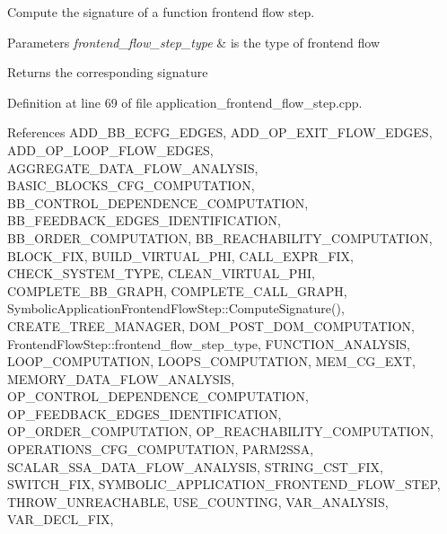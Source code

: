 Compute the signature of a function frontend flow step. 


\begin{DoxyParams}{Parameters}
{\em frontend\+\_\+flow\+\_\+step\+\_\+type} & is the type of frontend flow \\
\hline
\end{DoxyParams}
\begin{DoxyReturn}{Returns}
the corresponding signature 
\end{DoxyReturn}


Definition at line 69 of file application\+\_\+frontend\+\_\+flow\+\_\+step.\+cpp.



References A\+D\+D\+\_\+\+B\+B\+\_\+\+E\+C\+F\+G\+\_\+\+E\+D\+G\+ES, A\+D\+D\+\_\+\+O\+P\+\_\+\+E\+X\+I\+T\+\_\+\+F\+L\+O\+W\+\_\+\+E\+D\+G\+ES, A\+D\+D\+\_\+\+O\+P\+\_\+\+L\+O\+O\+P\+\_\+\+F\+L\+O\+W\+\_\+\+E\+D\+G\+ES, A\+G\+G\+R\+E\+G\+A\+T\+E\+\_\+\+D\+A\+T\+A\+\_\+\+F\+L\+O\+W\+\_\+\+A\+N\+A\+L\+Y\+S\+IS, B\+A\+S\+I\+C\+\_\+\+B\+L\+O\+C\+K\+S\+\_\+\+C\+F\+G\+\_\+\+C\+O\+M\+P\+U\+T\+A\+T\+I\+ON, B\+B\+\_\+\+C\+O\+N\+T\+R\+O\+L\+\_\+\+D\+E\+P\+E\+N\+D\+E\+N\+C\+E\+\_\+\+C\+O\+M\+P\+U\+T\+A\+T\+I\+ON, B\+B\+\_\+\+F\+E\+E\+D\+B\+A\+C\+K\+\_\+\+E\+D\+G\+E\+S\+\_\+\+I\+D\+E\+N\+T\+I\+F\+I\+C\+A\+T\+I\+ON, B\+B\+\_\+\+O\+R\+D\+E\+R\+\_\+\+C\+O\+M\+P\+U\+T\+A\+T\+I\+ON, B\+B\+\_\+\+R\+E\+A\+C\+H\+A\+B\+I\+L\+I\+T\+Y\+\_\+\+C\+O\+M\+P\+U\+T\+A\+T\+I\+ON, B\+L\+O\+C\+K\+\_\+\+F\+IX, B\+U\+I\+L\+D\+\_\+\+V\+I\+R\+T\+U\+A\+L\+\_\+\+P\+HI, C\+A\+L\+L\+\_\+\+E\+X\+P\+R\+\_\+\+F\+IX, C\+H\+E\+C\+K\+\_\+\+S\+Y\+S\+T\+E\+M\+\_\+\+T\+Y\+PE, C\+L\+E\+A\+N\+\_\+\+V\+I\+R\+T\+U\+A\+L\+\_\+\+P\+HI, C\+O\+M\+P\+L\+E\+T\+E\+\_\+\+B\+B\+\_\+\+G\+R\+A\+PH, C\+O\+M\+P\+L\+E\+T\+E\+\_\+\+C\+A\+L\+L\+\_\+\+G\+R\+A\+PH, Symbolic\+Application\+Frontend\+Flow\+Step\+::\+Compute\+Signature(), C\+R\+E\+A\+T\+E\+\_\+\+T\+R\+E\+E\+\_\+\+M\+A\+N\+A\+G\+ER, D\+O\+M\+\_\+\+P\+O\+S\+T\+\_\+\+D\+O\+M\+\_\+\+C\+O\+M\+P\+U\+T\+A\+T\+I\+ON, Frontend\+Flow\+Step\+::frontend\+\_\+flow\+\_\+step\+\_\+type, F\+U\+N\+C\+T\+I\+O\+N\+\_\+\+A\+N\+A\+L\+Y\+S\+IS, L\+O\+O\+P\+\_\+\+C\+O\+M\+P\+U\+T\+A\+T\+I\+ON, L\+O\+O\+P\+S\+\_\+\+C\+O\+M\+P\+U\+T\+A\+T\+I\+ON, M\+E\+M\+\_\+\+C\+G\+\_\+\+E\+XT, M\+E\+M\+O\+R\+Y\+\_\+\+D\+A\+T\+A\+\_\+\+F\+L\+O\+W\+\_\+\+A\+N\+A\+L\+Y\+S\+IS, O\+P\+\_\+\+C\+O\+N\+T\+R\+O\+L\+\_\+\+D\+E\+P\+E\+N\+D\+E\+N\+C\+E\+\_\+\+C\+O\+M\+P\+U\+T\+A\+T\+I\+ON, O\+P\+\_\+\+F\+E\+E\+D\+B\+A\+C\+K\+\_\+\+E\+D\+G\+E\+S\+\_\+\+I\+D\+E\+N\+T\+I\+F\+I\+C\+A\+T\+I\+ON, O\+P\+\_\+\+O\+R\+D\+E\+R\+\_\+\+C\+O\+M\+P\+U\+T\+A\+T\+I\+ON, O\+P\+\_\+\+R\+E\+A\+C\+H\+A\+B\+I\+L\+I\+T\+Y\+\_\+\+C\+O\+M\+P\+U\+T\+A\+T\+I\+ON, O\+P\+E\+R\+A\+T\+I\+O\+N\+S\+\_\+\+C\+F\+G\+\_\+\+C\+O\+M\+P\+U\+T\+A\+T\+I\+ON, P\+A\+R\+M2\+S\+SA, S\+C\+A\+L\+A\+R\+\_\+\+S\+S\+A\+\_\+\+D\+A\+T\+A\+\_\+\+F\+L\+O\+W\+\_\+\+A\+N\+A\+L\+Y\+S\+IS, S\+T\+R\+I\+N\+G\+\_\+\+C\+S\+T\+\_\+\+F\+IX, S\+W\+I\+T\+C\+H\+\_\+\+F\+IX, S\+Y\+M\+B\+O\+L\+I\+C\+\_\+\+A\+P\+P\+L\+I\+C\+A\+T\+I\+O\+N\+\_\+\+F\+R\+O\+N\+T\+E\+N\+D\+\_\+\+F\+L\+O\+W\+\_\+\+S\+T\+EP, T\+H\+R\+O\+W\+\_\+\+U\+N\+R\+E\+A\+C\+H\+A\+B\+LE, U\+S\+E\+\_\+\+C\+O\+U\+N\+T\+I\+NG, V\+A\+R\+\_\+\+A\+N\+A\+L\+Y\+S\+IS, V\+A\+R\+\_\+\+D\+E\+C\+L\+\_\+\+F\+IX, 